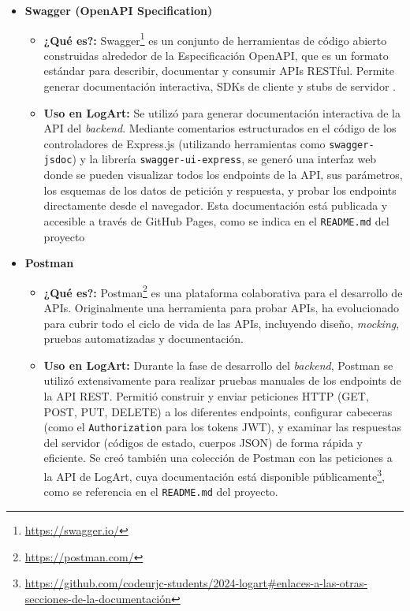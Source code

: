     \begin{itemize}
        \item \textbf{Swagger (OpenAPI Specification)}
            \begin{itemize}
                \item \textbf{¿Qué es?:} Swagger\footnote{\url{https://swagger.io/}} es un conjunto de herramientas de código abierto construidas alrededor de la Especificación OpenAPI, que es un formato estándar para describir, documentar y consumir APIs RESTful. Permite generar documentación interactiva, SDKs de cliente y stubs de servidor \cite{kabartoloSwaggerJSDocExpress}.
                \item \textbf{Uso en LogArt:} Se utilizó para generar documentación interactiva de la API del \textit{backend}. Mediante comentarios estructurados en el código de los controladores de Express.js (utilizando herramientas como \texttt{swagger-jsdoc}) y la librería \texttt{swagger-ui-express}, se generó una interfaz web donde se pueden visualizar todos los endpoints de la API, sus parámetros, los esquemas de los datos de petición y respuesta, y probar los endpoints directamente desde el navegador. Esta documentación está publicada y accesible a través de GitHub Pages, como se indica en el \texttt{README.md} del proyecto
            \end{itemize}
            \vspace{0.3cm}

            \item \textbf{Postman}
                \begin{itemize}
                    \item \textbf{¿Qué es?:} Postman\footnote{\url{https://postman.com/}} es una plataforma colaborativa para el desarrollo de APIs. Originalmente una herramienta para probar APIs, ha evolucionado para cubrir todo el ciclo de vida de las APIs, incluyendo diseño, \textit{mocking}, pruebas automatizadas y documentación.
                    \item \textbf{Uso en LogArt:} Durante la fase de desarrollo del \textit{backend}, Postman se utilizó extensivamente para realizar pruebas manuales de los endpoints de la API REST. Permitió construir y enviar peticiones HTTP (GET, POST, PUT, DELETE) a los diferentes endpoints, configurar cabeceras (como 
 el \texttt{Authorization} para los tokens JWT), y examinar las respuestas del servidor (códigos de estado, cuerpos JSON) de forma rápida y eficiente. Se creó también una colección de Postman con las peticiones a la API de LogArt, cuya documentación está disponible públicamente\footnote{\url{https://github.com/codeurjc-students/2024-logart#enlaces-a-las-otras-secciones-de-la-documentación}}, como se referencia en el \texttt{README.md} del proyecto.
                \end{itemize}
    \end{itemize}

